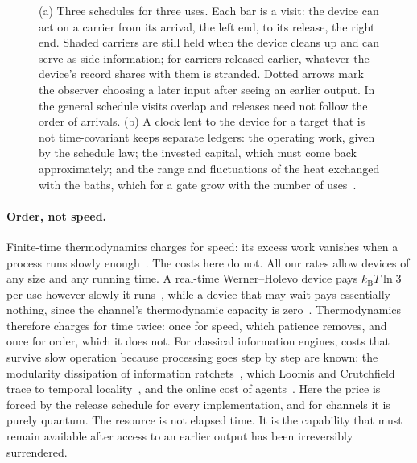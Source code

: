 \documentclass[11pt]{article}
\theoremstyle{definition}
\theoremstyle{remark}
\newcommand{\kB}{k_{\mathrm B}}
\begin{document}
\begin{figure}[t]
\caption{(a) Three schedules for three uses. Each bar is a visit: the device can act on a carrier from its arrival, the left end, to its release, the right end. Shaded carriers are still held when the device cleans up and can serve as side information; for carriers released earlier, whatever the device's record shares with them is stranded. Dotted arrows mark the observer choosing a later input after seeing an earlier output. In the general schedule visits overlap and releases need not follow the order of arrivals. (b) A clock lent to the device for a target that is not time-covariant keeps separate ledgers: the operating work, given by the schedule law; the invested capital, which must come back approximately; and the range and fluctuations of the heat exchanged with the baths, which for a gate grow with the number of uses~\cite{KeepingTime}.}
\label{fig:schedules}
\end{figure}

\paragraph{Order, not speed.} Finite-time thermodynamics charges for speed: its excess work vanishes when a process runs slowly enough~\cite{SalamonBerry83,Crooks07,Proesmans20}. The costs here do not. All our rates allow devices of any size and any running time. A real-time Werner--Holevo device pays $\kB T\ln3$ per use however slowly it runs~\cite{ImmediateDelivery,SaveWork}, while a device that may wait pays essentially nothing, since the channel's thermodynamic capacity is zero~\cite{FBB21}. Thermodynamics therefore charges for time twice: once for speed, which patience removes, and once for order, which it does not. For classical information engines, costs that survive slow operation because processing goes step by step are known: the modularity dissipation of information ratchets~\cite{BMC18}, which Loomis and Crutchfield trace to temporal locality~\cite{LoomisCrutchfield20}, and the online cost of agents~\cite{Thompson25}. Here the price is forced by the release schedule for every implementation, and for channels it is purely quantum. The resource is not elapsed time. It is the capability that must remain available after access to an earlier output has been irreversibly surrendered.
\end{document}
